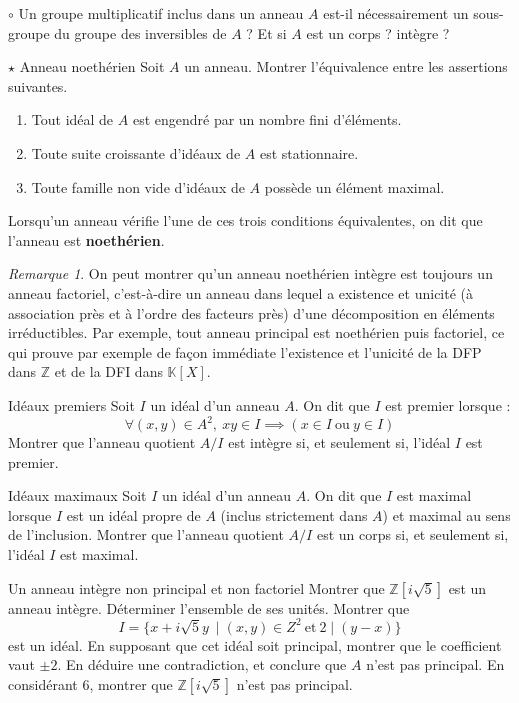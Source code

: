 \documentclass[french,a4paper]{article}
\newcommand{\Z}{\mathbb{Z}}
\newcommand{\K}{\mathbb{K}}
\theoremstyle{plain}
\theoremstyle{definition}
\theoremstyle{remark}
\newtheorem*{rmq}{Remarque}
\begin{document}
\begin{ex}[Moulin.AG.31]{$\circ$}
	Un groupe multiplicatif inclus dans un anneau $A$ est-il nécessairement un sous-groupe du groupe des inversibles de $A$ ? Et si $A$ est un corps ? intègre ?
\end{ex}

\begin{ex}[Moulin.AG.40]{$\star$ Anneau noethérien}
	Soit $A$ un anneau. Montrer l'équivalence entre les assertions suivantes.
	\begin{enumerate}
		\item Tout idéal de $A$ est engendré par un nombre fini d'éléments.
		\item Toute suite croissante d'idéaux de $A$ est stationnaire.
		\item Toute famille non vide d'idéaux de $A$ possède un élément maximal.
	\end{enumerate}
	Lorsqu'un anneau vérifie l'une de ces trois conditions équivalentes, on dit que l'anneau est \textbf{noethérien}.
\end{ex}

\begin{rmq}
	On peut montrer qu'un anneau noethérien intègre est toujours un anneau factoriel, c'est-à-dire un anneau dans lequel a existence et unicité (à association près et à l'ordre des facteurs près) d'une décomposition en éléments irréductibles. Par exemple, tout anneau principal est noethérien puis factoriel, ce qui prouve par exemple de façon immédiate l'existence et l'unicité de la DFP dans $\Z$ et de la DFI dans $\K[X]$.
\end{rmq}

\begin{ex}{Idéaux premiers}
	Soit $I$ un idéal d'un anneau $A$. On dit que $I$ est premier lorsque : $$\forall (x,y)\in A^2,\ xy\in I\implies (x\in I\ \text{ou}\ y\in I)$$ Montrer que l'anneau quotient $A/I$ est intègre si, et seulement si, l'idéal $I$ est premier.
\end{ex}

\begin{ex}[Morlot]{Idéaux maximaux}
	Soit $I$ un idéal d'un anneau $A$. On dit que $I$ est maximal lorsque $I$ est un idéal propre de $A$ (inclus strictement dans $A$) et maximal au sens de l'inclusion. Montrer que l'anneau quotient $A/I$ est un corps si, et seulement si, l'idéal $I$ est maximal.
\end{ex}

\begin{ex}[Morlot]{Un anneau intègre non principal et non factoriel}
	Montrer que $\Z[i\sqrt{5}]$ est un anneau intègre. Déterminer l'ensemble de ses unités. Montrer que $$I=\{x+i\sqrt{5}y\ \mid (x,y)\in Z^2\ \text{et}\ 2\mid (y-x)\}$$ est un idéal. En supposant que cet idéal soit principal, montrer que le coefficient vaut $\pm 2$. En déduire une contradiction, et conclure que $A$ n'est pas principal. En considérant $6$, montrer que $\Z[i\sqrt{5}]$ n'est pas principal.
\end{ex}
\end{document}
